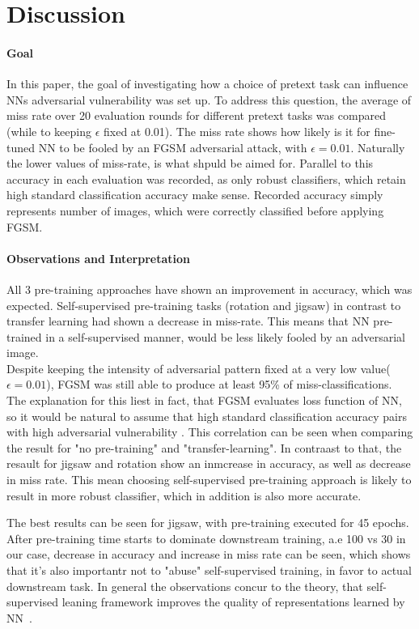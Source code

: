 \section{Discussion}

\paragraph{Goal}In this paper,
the goal of investigating how a choice of pretext task can influence NNs adversarial vulnerability was set up.
To address this question, the average of miss rate over 20 evaluation rounds for different pretext tasks was compared
(while to keeping $\epsilon$ fixed at 0.01).
The miss rate shows how likely is it for fine-tuned NN to be fooled by an FGSM adversarial attack,
with $\epsilon = 0.01$.
Naturally the lower values of miss-rate, is what shpuld be aimed for.
Parallel to this accuracy in each evaluation was recorded, as only robust classifiers, which retain high standard
classification accuracy make sense.
Recorded accuracy simply represents number of images, which were correctly classified before applying FGSM.

\paragraph{Observations and Interpretation}
All 3 pre-training approaches have shown an improvement in accuracy, which was expected.
Self-supervised pre-training tasks (rotation and jigsaw) in contrast to transfer learning had shown a decrease
in miss-rate.
This means that NN pre-trained in a self-supervised manner, would be less likely fooled by an adversarial image.
\\
Despite keeping the intensity of adversarial pattern fixed at a very low value($\epsilon = 0.01$),
FGSM was still able to produce at least 95\% of miss-classifications.
The explanation for this liest in fact, that FGSM evaluates loss function of NN,
so it would be natural to assume that high standard classification accuracy pairs with high adversarial vulnerability
\cite{https://doi.org/10.48550/arxiv.1805.12152}.
This correlation can be seen when comparing the result for "no pre-training" and "transfer-learning".
In contraast to that, the resault for jigsaw and rotation show an inmcrease in accuracy, as well
as decrease in miss rate.
This mean choosing self-supervised pre-training approach is likely to result in more robust classifier,
which in addition is also more accurate.

The best results can be seen for jigsaw, with pre-training executed for 45 epochs.
After pre-training time starts to dominate downstream training, a.e 100 vs 30 in our case,
decrease in accuracy and increase in miss rate can be seen, which shows that it's also importantr
not to "abuse" self-supervised training, in favor to actual downstream task.
In general the observations concur to the theory, that self-supervised leaning framework improves the quality of representations
learned by NN~\cite{kolesnikov2019revisiting}.


